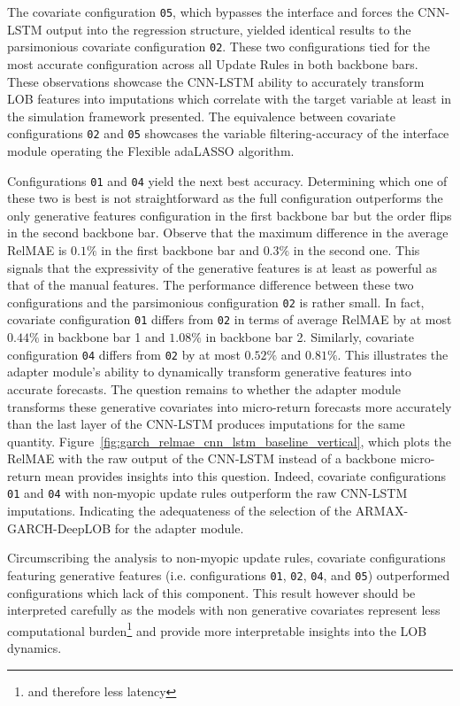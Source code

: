 \documentclass[10pt,a4paper,oneside]{article}
\begin{document}
The covariate configuration \verb|05|, which bypasses the interface and forces the CNN-LSTM output into the regression structure, yielded identical results to the parsimonious covariate configuration \verb|02|. These two configurations tied for the most accurate configuration across all Update Rules in both backbone bars. These observations showcase the CNN-LSTM ability to accurately transform LOB features into imputations which correlate with the target variable at least in the simulation framework presented. The equivalence between covariate configurations \verb|02| and \verb|05| showcases the variable filtering-accuracy of the interface module operating the Flexible adaLASSO algorithm.

Configurations \verb|01| and \verb|04| yield the next best accuracy. Determining which one of these two is best is not straightforward as the full configuration outperforms the only generative features configuration in the first backbone bar but the order flips in the second backbone bar. Observe that the maximum difference in the average RelMAE is $0.1\%$ in the first backbone bar and $0.3\%$ in the second one. This signals that the expressivity of the generative features is at least as powerful as that of the manual features. The performance difference between these two configurations and the parsimonious configuration \verb|02| is rather small. In fact, covariate configuration \verb|01| differs from \verb|02| in terms of average RelMAE by at most $0.44\%$ in backbone bar 1 and $1.08\%$ in backbone bar 2. Similarly, covariate configuration \verb|04| differs from \verb|02| by at most $0.52\%$ and $0.81\%$. This illustrates the adapter module's ability to dynamically transform generative features into accurate forecasts. The question remains to whether the adapter module transforms these generative covariates into micro-return forecasts more accurately than the last layer of the CNN-LSTM produces imputations for the same quantity. Figure~\ref{fig:garch_relmae_cnn_lstm_baseline_vertical}, which plots the RelMAE with the raw output of the CNN-LSTM instead of a backbone micro-return mean provides insights into this question. Indeed, covariate configurations \verb|01| and \verb|04| with non-myopic update rules outperform the raw CNN-LSTM imputations. Indicating the adequateness of the selection of the ARMAX-GARCH-DeepLOB for the adapter module.

Circumscribing the analysis to non-myopic update rules, covariate configurations featuring generative features (i.e. configurations \verb|01|, \verb|02|, \verb|04|, and \verb|05|) outperformed configurations which lack of this component. This result however should be interpreted carefully as the models with non generative covariates represent less computational burden\footnote{and therefore less latency} and provide more interpretable insights into the LOB dynamics.
\end{document}
